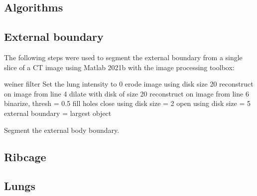 \begin{appendices}
\chapter{Algorithms} \label{app:appendix-algos}

\section{External boundary}
The following steps were used to segment the external boundary 
from a single slice 
of a CT image using Matlab 2021b  
with the image processing toolbox:

\begin{algorithm}[H]
	\SetAlgoLined
		weiner filter\;
		Set the lung intensity to 0\;
		erode image using disk size 20\;
		reconstruct on image from line 4\;
		dilate with disk of size 20\;
		reconstruct on image from line 6\;
		binarize, thresh = 0.5\;
		fill holes\;
		close using disk size = 2\;
		open using disk size = 5\;
		external boundary = largest object\;
	\caption{Segment the external body boundary.}
\end{algorithm}


\section{Ribcage}
\section{Lungs}
\end{appendices}